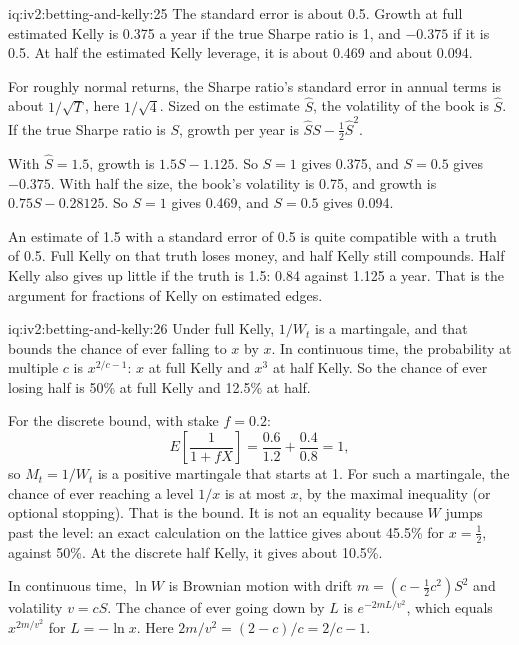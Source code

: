 \begin{solution}{iq:iv2:betting-and-kelly:25}
The standard error is about 0.5. Growth at full estimated Kelly is 0.375 a year if the true Sharpe ratio is 1, and $-0.375$ if it is 0.5. At half the estimated Kelly leverage, it is about 0.469 and about 0.094.

For roughly normal returns, the Sharpe ratio's standard error in annual terms is about $1/\sqrt{T}$, here $1/\sqrt 4$. Sized on the estimate $\hat S$, the volatility of the book is $\hat S$. If the true Sharpe ratio is $S$, growth per year is $\hat S S - \tfrac12\hat S^2$.

With $\hat S = 1.5$, growth is $1.5S - 1.125$. So $S = 1$ gives 0.375, and $S = 0.5$ gives $-0.375$. With half the size, the book's volatility is 0.75, and growth is $0.75S - 0.28125$. So $S = 1$ gives 0.469, and $S = 0.5$ gives 0.094.

An estimate of 1.5 with a standard error of 0.5 is quite compatible with a truth of 0.5. Full Kelly on that truth loses money, and half Kelly still compounds. Half Kelly also gives up little if the truth is 1.5: 0.84 against 1.125 a year. That is the argument for fractions of Kelly on estimated edges.

\end{solution}

\begin{solution}{iq:iv2:betting-and-kelly:26}
Under full Kelly, $1/W_t$ is a martingale, and that bounds the chance of ever falling to $x$ by $x$. In continuous time, the probability at multiple $c$ is $x^{2/c - 1}$: $x$ at full Kelly and $x^3$ at half Kelly. So the chance of ever losing half is 50\% at full Kelly and 12.5\% at half.

For the discrete bound, with stake $f = 0.2$:
\[
E\left[\frac{1}{1 + fX}\right] = \frac{0.6}{1.2} + \frac{0.4}{0.8} = 1,
\]
so $M_t = 1/W_t$ is a positive martingale that starts at 1. For such a martingale, the chance of ever reaching a level $1/x$ is at most $x$, by the maximal inequality (or optional stopping). That is the bound. It is not an equality because $W$ jumps past the level: an exact calculation on the lattice gives about 45.5\% for $x = \tfrac12$, against 50\%. At the discrete half Kelly, it gives about 10.5\%.

In continuous time, $\ln W$ is Brownian motion with drift $m = (c - \tfrac12 c^2)S^2$ and volatility $v = cS$. The chance of ever going down by $L$ is $e^{-2mL/v^2}$, which equals $x^{2m/v^2}$ for $L = -\ln x$. Here $2m/v^2 = (2 - c)/c = 2/c - 1$.

\end{solution}

